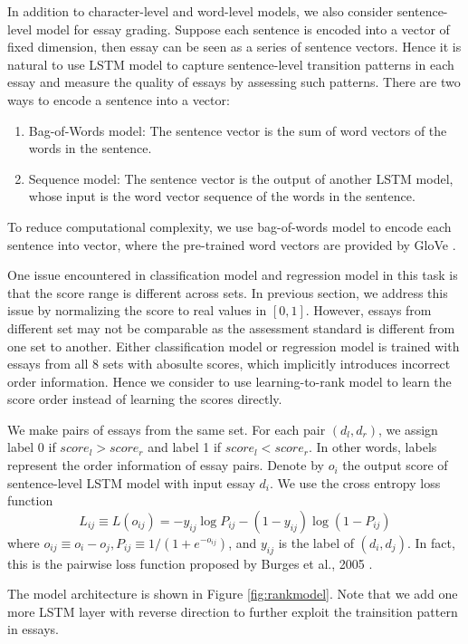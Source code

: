 \documentclass[10pt,psamsfonts]{amsart}
\theoremstyle{definition}
\theoremstyle{remark}
\numberwithin{equation}{section}
\begin{document}
In addition to character-level and word-level models, we also consider sentence-level model for essay grading. Suppose each sentence is encoded into a vector of fixed dimension, then essay can be seen as a series of sentence vectors. Hence it is natural to use LSTM model to capture sentence-level transition patterns in each essay and measure the quality of essays by assessing such patterns. There are two ways to encode a sentence into a vector:
\begin{enumerate}
\item Bag-of-Words model: The sentence vector is the sum of word vectors of the words in the sentence.
\item Sequence model: The sentence vector is the output of another LSTM model, whose input is the word vector sequence of the words in the sentence. 
\end{enumerate}
To reduce computational complexity, we use bag-of-words model to encode each sentence into vector, where the pre-trained word vectors are provided by GloVe \cite{glove}.

One issue encountered in classification model and regression model in this task is that the score range is different across sets. In previous section, we address this issue by normalizing the score to real values in $[0, 1]$. However, essays from different set may not be comparable as the assessment standard is different from one set to another. Either classification model or regression model is trained with essays from all 8 sets with abosulte scores, which implicitly introduces incorrect order information. Hence we  consider to use learning-to-rank model to learn the score order instead of learning the scores directly. 

We make pairs of essays from the same set. For each pair $(d_l, d_r)$, we assign label 0 if $score_l>score_r$ and label 1 if $score_l<score_r$. In other words, labels represent the order information of essay pairs. Denote by $o_i$ the output score of sentence-level LSTM model with input essay $d_i$. We use the cross entropy loss function
$$L_{ij}\equiv L(o_{ij})=-y_{ij}\log P_{ij}-(1-y_{ij})\log(1-P_{ij})$$ 
where $o_{ij}\equiv o_i-o_j, P_{ij}\equiv 1/(1+e^{-o_{ij}})$, and $y_{ij}$ is the label of $(d_i, d_j)$. In fact, this is the pairwise loss function proposed by Burges et al., 2005 \cite{ranknet}.

The model architecture is shown in Figure \ref{fig:rankmodel}. Note that we add one more LSTM layer with reverse direction to further exploit the trainsition pattern in essays.
\end{document}
